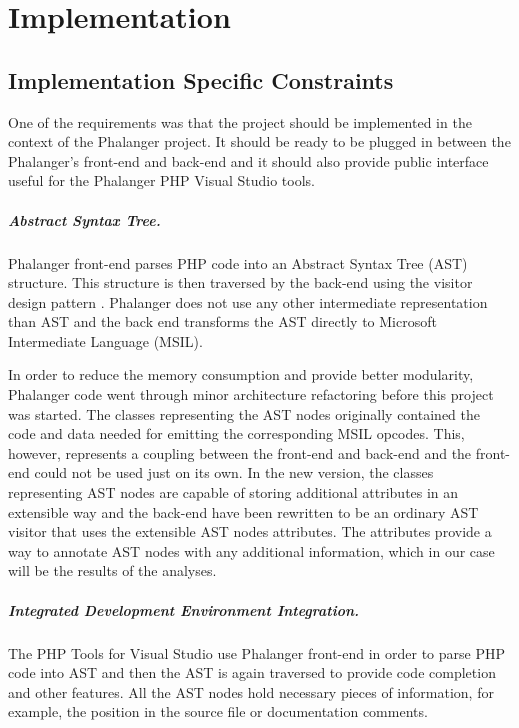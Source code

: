 \chapter{Implementation}

    \section{Implementation Specific Constraints}
    
    One of the requirements was that the project should be implemented 
    in the context of the Phalanger project. It should be ready 
    to be plugged in between the Phalanger's front-end and back-end and 
    it should also provide public interface useful for the 
    Phalanger PHP Visual Studio tools.
    
    \paragraph{Abstract Syntax Tree.} Phalanger front-end parses PHP code 
    into an Abstract Syntax Tree (AST) \cite{aho1985compilers} structure. 
    This structure is then traversed by the back-end using the 
    visitor design pattern \cite{gamma1994design}. Phalanger does not 
    use any other intermediate representation than AST and the 
    back end transforms the AST directly to Microsoft Intermediate Language (MSIL).
    
    In order to reduce the memory consumption and provide better 
    modularity, Phalanger code went through minor architecture 
    refactoring before this project was started.     
    The classes representing the AST nodes originally contained 
    the code and data needed for emitting the corresponding 
    MSIL opcodes. This, however, represents 
    a coupling between the front-end and back-end and the 
    front-end could not be used just on its own. In the new 
    version, the classes representing AST nodes are capable 
    of storing additional attributes in an extensible way 
    and the back-end have been rewritten to be an ordinary AST 
    visitor that uses the extensible AST nodes attributes.
    The attributes provide a way to annotate AST nodes 
    with any additional information, which in our case will be 
    the results of the analyses.    
    
    \paragraph{Integrated Development Environment Integration.}
    The PHP Tools for Visual Studio use Phalanger front-end in order to 
    parse PHP code into AST and then the AST is again traversed to provide 
    code completion and other features. All the AST nodes hold necessary 
    pieces of information, for example, the position in the source file or 
    documentation comments.
    
